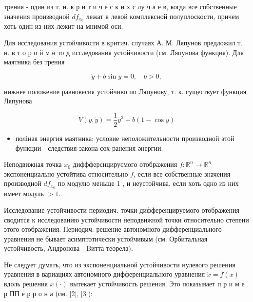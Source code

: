 \documentclass[10pt]{article}
\begin{document}
трения - один из т. н. к р и т и ч е с к и х с лу ч а е в, когда все собственные значения производной $d f_{x_{0}}$ лежат в левой комплексной полуплоскости, причем хоть один из них лежит на мнимой оси.



Для исследования устойчивости в критич. случаях А. М. Ляпунов предложил т. н. в т о р о й м ө то д исследования устойчивости (см. Ляпунова функция). Для маятника без трения



\[

\ddot{y}+b \sin y=0, \quad b>0,

\]



нижнее положение равновесия устойчиво по Ляпунову, т. к. существует функция Ляпунова



\[

V(y, \dot{y})=\frac{1}{2} \dot{y}^{2}+b(1-\cos y)

\]



\begin{itemize}

  \item поліная энергия маятника; условие неположительности производной этой функции - следствия закона сох ранения әнергии.

\end{itemize}



Неподвижная точка $x_{0}$ диффферснцирусмого отображения $f: \mathbb{R}^{n} \longrightarrow \mathbb{R}^{n}$ экспоненциально устойтива относительно $f$, если все собственные значения производной $d f_{x_{0}}$ по модулю меньше 1 , и неустойчива, если хоть одно из них имеет модуль $>1$.



Исследование устойчивости периодич. точки дифференцируемого отображения сводится к исследованию устойчивости неподвижной точки относительно степени этого отображения. Периодич. решение автономного дифференциального уравнения не бывает асимптотически устойчивым (см. Орбитальная устойчивость, Андронова - Bитта теорела).



Не следует думать, что из экспоненциальной устойчивости нулевого решения уравнения в вариациях автономного дифференциального уравнения $\dot{x}=f(x)$ вдоль решения $x(\cdot)$ вытекает устойчивость решения. Это показывает п р и м е р ПП е р р о н а (см. [2], [3]):
\end{document}
